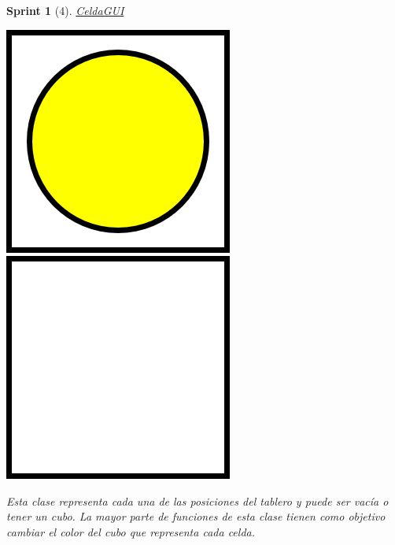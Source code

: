 \documentclass[12pt,a4paper,openright]{book}
\theoremstyle{break}
\newtheorem*{sprint}{Sprint}
\begin{document}
\begin{sprint}[4]
\underline{CeldaGUI}
\begin{center}
\includegraphics[scale=0.5]{yellowCube.png}
\includegraphics[scale=0.5]{emptyCell.png}
\end{center}

Esta clase representa cada una de las posiciones del tablero y puede ser vacía o tener un cubo. La mayor parte de funciones de esta clase  tienen como objetivo cambiar el color del cubo que representa cada celda.


\end{sprint}
\end{document}
